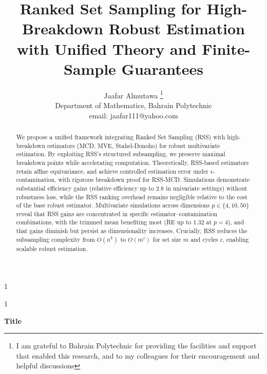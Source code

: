 \documentclass[12pt]{article}
\newcommand{\anon}{1}
\begin{document}
\def\spacingset#1{\renewcommand{\baselinestretch}%
{#1}\small\normalsize} \spacingset{1}




\anon
{
  \title{\bf
  Ranked Set Sampling for High-Breakdown Robust Estimation with Unified Theory and Finite-Sample Guarantees
  }
  \author{Jaafar Almutawa \thanks{
I am grateful to Bahrain Polytechnic for providing the facilities and support that enabled this research, and to my colleagues for their encouragement and helpful discussions}\hspace{.2cm}\\
    Department of Mathematics, Bahrain Polytechnic\\
    email: jaafar111@yahoo.com
}
  \maketitle
} \fi

\anon
{
  \bigskip
  \bigskip
  \bigskip
  \begin{center}
    {\LARGE\bf Title}
\end{center}
  \medskip
} \fi

\bigskip
\begin{abstract}
We propose a unified framework integrating Ranked Set Sampling (RSS) with high-breakdown estimators (MCD, MVE, Stahel-Donoho) for robust multivariate estimation. By exploiting RSS's structured subsampling, we preserve maximal breakdown points while accelerating computation. Theoretically, RSS-based estimators retain affine equivariance, and achieve controlled estimation error under $\epsilon$-contamination, with rigorous breakdown proof for RSS-MCD.
Simulations demonstrate substantial efficiency gains (relative efficiency up to 2.8 in univariate settings) without robustness loss, while the RSS ranking overhead remains negligible relative to the cost of the base robust estimator. Multivariate simulations across dimensions $p \in \{4, 10, 50\}$ reveal that RSS gains are concentrated in specific estimator--contamination combinations, with the trimmed mean benefiting most (RE up to 1.32 at $p=4$), and that gains diminish but persist as dimensionality increases.
Crucially, RSS reduces the subsampling complexity from \(O(n^k)\) to \(O(m^c)\) for set size \(m\) and cycles \(c\), enabling scalable robust estimation.
\end{abstract}
\end{document}
